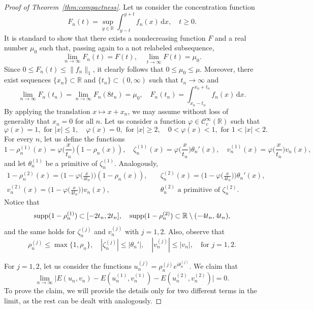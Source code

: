 \documentclass[11pt]{article}
\newcommand{\R}{\mathbb{R}}
\newcommand{\boC}{\mathcal{C}}
\renewcommand{\d}{\,\mathrm{d}}
\DeclareMathOperator{\supp}{{\rm supp}}
\theoremstyle{plain}
\theoremstyle{definition}
\theoremstyle{remark}
\numberwithin{equation}{section}
\begin{document}
{\begin{proof}[Proof of Theorem~\ref{thm:compactness}]
    Let us consider the concentration function
    \[F_n(t)=\sup_{y\in\R}\int_{y-t}^{y+t}f_n(x)\d x,\quad t\geq 0.\]
    It is standard to show that there exists a nondecreasing function $F$ and a real number $\mu_0$ such that, passing again to a not relabeled subsequence, 
    \[\lim_{n\to\infty}F_n(t)=F(t),\quad\lim_{t\to\infty}F(t)=\mu_0.\]
    Since $0\leq F_n(t)\leq\|f_n\|_1$, it clearly follows that $0\leq\mu_0\leq\mu$. Moreover, there exist sequences $\{x_n\}\subset\R$ and $\{t_n\}\subset (0,\infty)$ such that $t_n\to\infty$ and 
    \[\lim_{n\to\infty}F_n(t_n)=\lim_{n\to\infty}F_n(8t_n)=\mu_0,\quad F_n(t_n)=\int_{x_n-t_n}^{x_n+t_n}f_n(x)\d x.\]
By applying the translation $x\mapsto x+x_n$, we may assume without loss of generality that $x_n=0$ for all $n$. Let us consider a function $\varphi\in\boC_c^\infty(\R)$ such that 
    \[\varphi(x)=1,\text{ for }|x|\leq 1,\quad\varphi(x)=0,\text{ for }|x|\geq 2,\quad 0<\varphi(x)< 1,\text{ for } 1<|x|<2.\]
    For every $n$, let us define the functions
    \[1-\rho_n^{(1)}(x)=\varphi\Big(\frac{x}{t_n}\Big)(1-\rho_n(x)),\quad \zeta_n^{(1)}(x)=\varphi\Big(\frac{x}{t_n}\Big)\theta_n'(x),\quad v_n^{(1)}(x)=\varphi\Big(\frac{x}{t_n}\Big)v_n(x),\]
    and let $\theta_n^{(1)}$ be a primitive of $\zeta_n^{(1)}$. Analogously,
    \begin{align*}
        1-\rho_n^{(2)}(x)=\Big(1-\varphi\Big(\frac{x}{4t_n}\Big)\Big)(1-\rho_n(x)),\quad &\zeta_n^{(2)}(x)=\Big(1-\varphi\Big(\frac{x}{4t_n}\Big)\Big)\theta_n'(x),
        \\
        v_n^{(2)}(x)=\Big(1-\varphi\Big(\frac{x}{4t_n}\Big)\Big)v_n(x),\quad &\theta_n^{(2)}\text{ a primitive of }\zeta_n^{(2)}.
    \end{align*}
    Notice that
    \begin{equation}\label{eeq1}
    \supp(1-\rho_n^{(1)})\subset [-2t_n,2t_n],\quad\supp(1-\rho_n^{(2)})\subset\R\setminus(-4t_n,4t_n),
    \end{equation}
    and the same holds for $\zeta_n^{(j)}$ and $v_n^{(j)}$ with $j=1,2$. Also, observe that
    \begin{equation}\label{eq:max}
        \rho_n^{(j)}\leq\max\{1,\rho_n\},\quad|\zeta_n^{(j)}|\leq|\theta_n'|,\quad |v_n^{(j)}|\leq|v_n|,\quad\text{for }j=1,2.
    \end{equation}
    
    For $j=1,2$, let us  consider the functions $u_n^{(j)}=\rho_n^{(j)}e^{i\theta_n^{(j)}}$. We claim that
    \begin{equation}\label{claim:dichotomy}
    \lim_{n\to\infty}\Big|E(u_n,v_n)-E(u_n^{(1)},v_n^{(1)})-E(u_n^{(2)},v_n^{(2)})\Big|=0.
    \end{equation}
    To prove the claim, we will provide the details only for two different terms in the limit, as the rest can be dealt with analogously.


\end{proof}}
\end{document}
